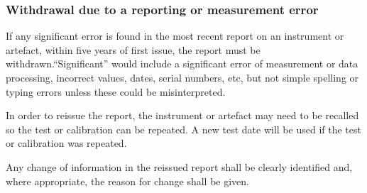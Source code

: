 \subsubsection{Withdrawal due to a reporting or measurement error}
\label{sss:reissue_report}
If any significant error is found in the most recent report on an instrument or artefact, within five years of first issue, the report must be withdrawn.``Significant'' would include a significant error of measurement or data processing, incorrect values, dates, serial numbers, etc, but not simple spelling or typing errors unless these could be misinterpreted.

In order to reissue the report, the instrument or artefact may need to be recalled so the test or calibration can be repeated. A new test date will be used if the test or calibration was repeated.

Any change of information in the reissued report shall be clearly identified and, where appropriate, the reason for change shall be given.




